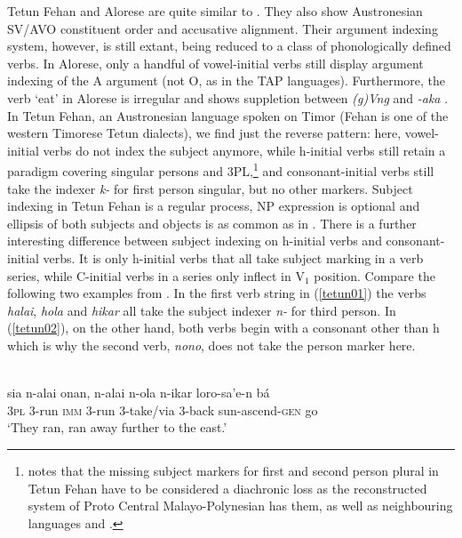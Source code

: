 Tetun Fehan and Alorese are quite similar to . They also show Austronesian SV/AVO constituent order and accusative alignment. Their argument indexing system, however, is still extant, being reduced to a class of phonologically defined verbs. In Alorese, only a handful of vowel-initial verbs still display argument indexing of the A argument (not O, as in the TAP languages). Furthermore, the verb `eat' in Alorese is irregular and shows suppletion between \textit{(g)Vng} and \textit{-aka} \citep[61]{klamer2011alorese}. In Tetun Fehan, an Austronesian language spoken on Timor (Fehan is one of the western Timorese Tetun dialects), we find just the reverse pattern: here, vowel-initial verbs do not index the subject anymore, while h-initial verbs still retain a paradigm covering singular persons and 3PL,\footnote{\citet[173 footnote 5]{vanklinken1999grammar} notes that the missing subject markers for first and second person plural in Tetun Fehan have to be considered a diachronic loss as the reconstructed system of Proto Central Malayo-Polynesian has them, as well as neighbouring languages  and .} and consonant-initial verbs still take the indexer \textit{k-} for first person singular, but no other markers. Subject indexing in Tetun Fehan is a regular process, NP expression is optional and ellipsis of both subjects and objects is as common as in . There is a further interesting difference between subject indexing on h-initial verbs and consonant-initial verbs. It is only h-initial verbs that all take subject marking in a verb series, while C-initial verbs in a series only inflect in V$_1$ position. Compare the following two examples from \citet{vanklinken1999grammar}. In the first verb string in (\ref{tetun01}) the verbs \textit{halai}, \textit{hola} and \textit{hikar} all take the subject indexer \textit{n-} for third person. In (\ref{tetun02}), on the other hand, both verbs begin with a consonant other than h which is why the second verb, \textit{nono}, does not take the person marker here.

\ea \label{tetun01}
\\
\gll sia n-alai onan, n-alai n-ola n-ikar loro-sa'e-n bá \\
\textsc{3}\textsc{pl} \textsc{3}-run \textsc{imm} \textsc{3}-run \textsc{3}-take/via \textsc{3}-back sun-ascend-\textsc{gen} go \\
\glft `They ran, ran away further to the east.'
\z

